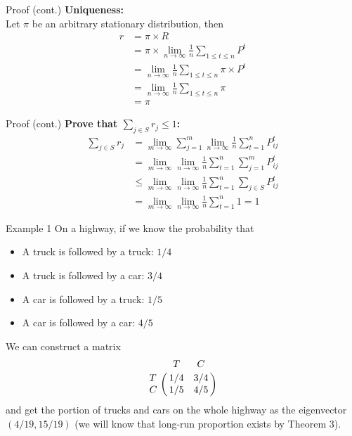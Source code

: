 \documentclass{beamer}
\begin{document}
\begin{frame}{Proof (cont.)}
	\textbf{Uniqueness:} \\
	Let $\pi$ be an arbitrary stationary distribution, then
	\begin{align*}
	r &= \pi \times R \\
	&= \pi \times \lim_{n\to\infty} \frac{1}{n} \sum_{1 \leq t \leq n} P^t \\
	&= \lim_{n\to\infty} \frac{1}{n} \sum_{1 \leq t \leq n} \pi \times P^t \\
	&= \lim_{n\to\infty} \frac{1}{n} \sum_{1 \leq t \leq n} \pi \\
	&= \pi
	\end{align*}
\end{frame}

\begin{frame}{Proof (cont.)}\label{proportion_sum}
	\textbf{Prove that $\sum_{j \in S} r_j \leq 1$:}\\
	\begin{align*}
	\sum_{j \in S} r_j & = 
	\lim_{m\to\infty} \sum_{j=1}^m \lim_{n\to\infty} \frac{1}{n} \sum_{t=1}^n P^t_{ij} \\
	& = \lim_{m\to\infty} \lim_{n\to\infty} \frac{1}{n}\sum_{t=1}^n \sum_{j=1}^m P^t_{ij} \\
	& \leq \lim_{m\to\infty} \lim_{n\to\infty} \frac{1}{n}\sum_{t=1}^n \sum_{j\in S} P^t_{ij} \\
	& = \lim_{m\to\infty} \lim_{n\to\infty} \frac{1}{n}\sum_{t=1}^n 1 = 1
	\end{align*}
\end{frame}

\begin{frame}{Example 1}
	On a highway, if we know the probability that
	\begin{itemize}
	\item A truck is followed by a truck: $1/4$
	\item A truck is followed by a car: $3/4$
	\item A car is followed by a truck: $1/5$
	\item A car is followed by a car: $4/5$
	\end{itemize}
	We can construct a matrix
	\[
	\bordermatrix{~ & T   & C   \cr
                  T & 1/4 & 3/4 \cr
                  C & 1/5 & 4/5 \cr}
	\]
	and get the portion of trucks and cars on the whole highway as the eigenvector $(4/19, 15/19)$
	(we will know that long-run proportion exists by Theorem 3).
\end{frame}
\end{document}
